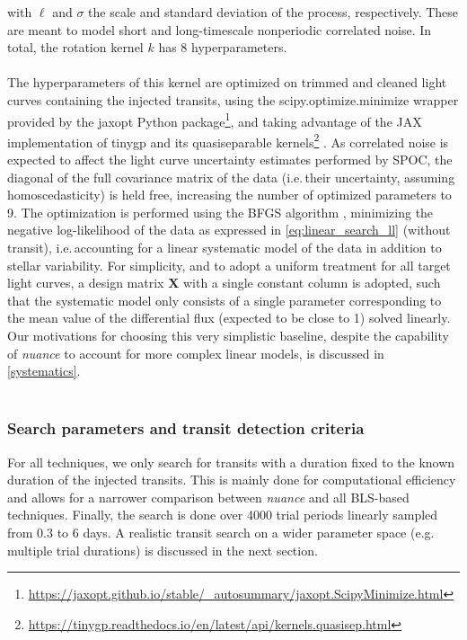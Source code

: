 \documentclass[modern,linenumbers]{aastex631}
\newcommand{\nuancemethod}{\textit{nuance}}
\newcommand{\footlink}[1]{\footnote{\url{#1}}}
\begin{document}
with $\ell$ and $\sigma$ the scale and standard deviation of the process, respectively. These are meant to model short and long-timescale nonperiodic correlated noise. In total, the rotation kernel $k$ has 8 hyperparameters.\\\\
The hyperparameters of this kernel are optimized on trimmed and cleaned light curves containing the injected transits, using the \textsf{scipy.optimize.minimize} wrapper provided by the \textsf{jaxopt} Python package\footlink{https://jaxopt.github.io/stable/_autosummary/jaxopt.ScipyMinimize.html}, and taking advantage of the \textsf{JAX} implementation of \textsf{tinygp} and its quasiseparable kernels\footlink{https://tinygp.readthedocs.io/en/latest/api/kernels.quasisep.html} \citep{celerite}. As correlated noise is expected to affect the light curve uncertainty estimates performed by SPOC, the diagonal of the full covariance matrix of the data (i.e.\,their uncertainty, assuming homoscedasticity) is held free, increasing the number of optimized parameters to 9. The optimization is performed using the \textsf{BFGS} algorithm \citep{Fletcher1987}, minimizing the negative log-likelihood of the data as expressed in \autoref{eq:linear_search_ll} (without transit), i.e.\,accounting for a linear systematic model of the data in addition to stellar variability. For simplicity, and to adopt a uniform treatment for all target light curves, a design matrix $\bm{X}$ with a single constant column is adopted, such that the systematic model only consists of a single parameter corresponding to the mean value of the differential flux (expected to be close to 1) solved linearly. Our motivations for choosing this very simplistic baseline, despite the capability of \nuancemethod{} to account for more complex linear models, is discussed in \autoref{systematics}.\\\\
\subsubsection*{Search parameters and transit detection criteria}
For all techniques, we only search for transits with a duration fixed to the known duration of the injected transits. This is mainly done for computational efficiency and allows for a narrower comparison between \nuancemethod{} and all BLS-based techniques. Finally, the search is done over 4000 trial periods linearly sampled from 0.3 to 6 days. A realistic transit search on a wider parameter space (e.g. multiple trial durations) is discussed in the next section.
\newpage
\end{document}

